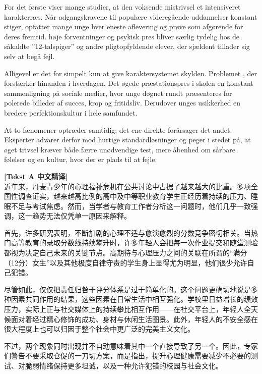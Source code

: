 For det første viser mange studier, at den voksende mistrivsel  et intensiveret karakterræs. Når adgangskravene til populære videregående uddannelser konstant stiger, opfatter mange unge hver eneste aflevering og prøve som afgørende for deres fremtid.  høje forventninger og psykisk pres bliver særlig tydelig hos de såkaldte ”12-talspiger” og andre pligtopfyldende elever, der sjældent tillader sig selv at begå fejl.

Alligevel er det for simpelt kun at give karaktersystemet skylden. Problemet , der forstærker hinanden i hverdagen. Det øgede præstationspres i skolen  en konstant sammenligning på sociale medier, hvor unge døgnet rundt præsenteres for polerede billeder af succes, krop og fritidsliv. Derudover  unges usikkerhed  en bredere perfektionskultur i hele samfundet.

At to fænomener optræder samtidig,  det ene direkte forårsager det andet. Eksperter advarer derfor mod hurtige standardløsninger og peger i stedet på, at øget trivsel kræver både færre unødvendige test, mere åbenhed om sårbare følelser og en kultur, hvor der er plads til at fejle.

\begin{transbox}
\small
\textbf{\color{NCDTeal}[Tekst A 中文精译]}\\
近年来，丹麦青少年的心理福祉危机在公共讨论中占据了越来越大的比重。多项全国性调查证实，越来越高比例的高中及中等职业教育学生正经历着持续的压力、睡眠不足与考试焦虑。然而，当学者与教育工作者分析这一问题时，他们几乎一致强调，这一趋势无法仅凭单一原因来解释。

首先，许多研究表明，不断加剧的心理不适与愈演愈烈的分数竞争密切相关。当热门高等教育的录取分数线持续攀升时，许多年轻人会把每一次作业提交和随堂测验都视为决定自己未来的关键节点。高期待与心理压力之间的关联在所谓的“满分（12分）女生”以及其他极度自律守责的学生身上显得尤为明显，他们很少允许自己犯错。

尽管如此，仅仅把责任归咎于评分体系是过于简单化的。这个问题更确切地说是多种因素共同作用的结果，这些因素在日常生活中相互强化。学校里日益增长的绩效压力，实际上正与社交媒体上的持续攀比相互作用——在社交平台上，年轻人全天候面对着经过精心修饰的成功、身材与休闲生活图景。此外，年轻人的不安全感在很大程度上也可以归因于整个社会中更广泛的完美主义文化。

不过，两个现象同时出现并不自动意味着其中一个直接导致了另一个。因此，专家们警告不要采取仓促的一刀切方案，而是指出，提升心理健康需要减少不必要的测试、对脆弱情绪保持更多坦诚，以及一种允许犯错的校园与社会文化。
\end{transbox}

